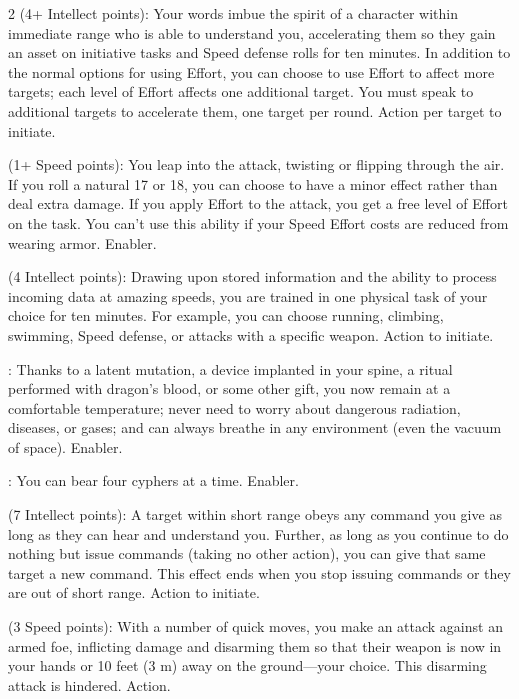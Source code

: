 \begin{multicols}{2}
 (4+ Intellect points): Your words imbue the spirit of a character within immediate range who is able to understand you, accelerating them so they gain an asset on initiative tasks and Speed defense rolls for ten minutes. In addition to the normal options for using Effort, you can choose to use Effort to affect more targets; each level of Effort affects one additional target. You must speak to additional targets to accelerate them, one target per round. Action per target to initiate. 

 (1+ Speed points): You leap into the attack, twisting or flipping through the air. If you roll a natural 17 or 18, you can choose to have a minor effect rather than deal extra damage. If you apply Effort to the attack, you get a free level of Effort on the task. You can’t use this ability if your Speed Effort costs are reduced from wearing armor. Enabler. 

 (4 Intellect points): Drawing upon stored information and the ability to process incoming data at amazing speeds, you are trained in one physical task of your choice for ten minutes. For example, you can choose running, climbing, swimming, Speed defense, or attacks with a specific weapon. Action to initiate. 

: Thanks to a latent mutation, a device implanted in your spine, a ritual performed with dragon’s blood, or some other gift, you now remain at a comfortable temperature; never need to worry about dangerous radiation, diseases, or gases; and can always breathe in any environment (even the vacuum of space). Enabler. 

: You can bear four cyphers at a time. Enabler. 

 (7 Intellect points): A target within short range obeys any command you give as long as they can hear and understand you. Further, as long as you continue to do nothing but issue commands (taking no other action), you can give that same target a new command. This effect ends when you stop issuing commands or they are out of short range. Action to initiate.

 (3 Speed points): With a number of quick moves, you make an attack against an armed foe, inflicting damage and disarming them so that their weapon is now in your hands or 10 feet (3 m) away on the ground—your choice. This disarming attack is hindered. Action. 


\end{multicols}
